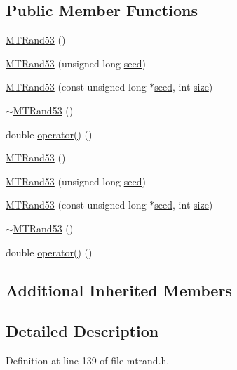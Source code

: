 \subsection*{Public Member Functions}
\begin{DoxyCompactItemize}
\item 
\hyperlink{a00017_a24711c9e6e5ee72715f34515d1f1939a}{M\-T\-Rand53} ()
\item 
\hyperlink{a00017_ad800887e15d4095f22facdb67f270c5e}{M\-T\-Rand53} (unsigned long \hyperlink{a00019_a0c57076fe30358e0700a7ce1baa0ea27}{seed})
\item 
\hyperlink{a00017_ac77b190d3ac27adea2d2c6c2ce2347c3}{M\-T\-Rand53} (const unsigned long $\ast$\hyperlink{a00019_a0c57076fe30358e0700a7ce1baa0ea27}{seed}, int \hyperlink{a00104_ae113ea7f9e515a12ac4b5595c6faf61e}{size})
\item 
\hyperlink{a00017_a947a6a7afd0c8a17612cda3faa705a75}{$\sim$\-M\-T\-Rand53} ()
\item 
double \hyperlink{a00017_ab6657cb5349f39bc4553d3a970458b45}{operator()} ()
\item 
\hyperlink{a00017_a24711c9e6e5ee72715f34515d1f1939a}{M\-T\-Rand53} ()
\item 
\hyperlink{a00017_ad800887e15d4095f22facdb67f270c5e}{M\-T\-Rand53} (unsigned long \hyperlink{a00019_a0c57076fe30358e0700a7ce1baa0ea27}{seed})
\item 
\hyperlink{a00017_ac77b190d3ac27adea2d2c6c2ce2347c3}{M\-T\-Rand53} (const unsigned long $\ast$\hyperlink{a00019_a0c57076fe30358e0700a7ce1baa0ea27}{seed}, int \hyperlink{a00104_ae113ea7f9e515a12ac4b5595c6faf61e}{size})
\item 
\hyperlink{a00017_a947a6a7afd0c8a17612cda3faa705a75}{$\sim$\-M\-T\-Rand53} ()
\item 
double \hyperlink{a00017_ab6657cb5349f39bc4553d3a970458b45}{operator()} ()
\end{DoxyCompactItemize}
\subsection*{Additional Inherited Members}


\subsection{Detailed Description}


Definition at line 139 of file mtrand.\-h.



